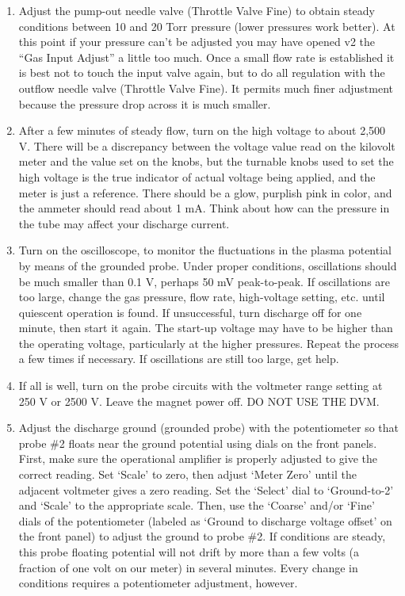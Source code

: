 \documentclass{../lab}
\begin{document}
\begin{enumerate}
    \item Adjust the pump-out needle valve (Throttle Valve Fine) to obtain steady conditions between 10 and 20 Torr pressure (lower pressures work better). At this point if your pressure can't be adjusted you may have opened v2 the ``Gas Input Adjust'' a little too much. Once a small flow rate is established it is best not to touch the input valve again, but to do all regulation with the outflow needle valve (Throttle Valve Fine). It permits much finer adjustment because the pressure drop across it is much smaller.

    \item After a few minutes of steady flow, turn on the high voltage to about 2,500 V. There will be a discrepancy between the voltage value read on the kilovolt meter and the value set on the knobs, but the turnable knobs used to set the high voltage is the true indicator of actual voltage being applied, and the meter is just a reference. There should be a glow, purplish pink in color, and the ammeter should read about 1 mA. Think about how can the pressure in the tube may affect your discharge current.

    \item Turn on the oscilloscope, to monitor the fluctuations in the plasma potential by means of the grounded probe. Under proper conditions, oscillations should be much smaller than 0.1 V, perhaps 50 mV peak-to-peak. If oscillations are too large, change the gas pressure, flow rate, high-voltage setting, etc. until quiescent operation is found. If unsuccessful, turn discharge off for one minute, then start it again. The start-up voltage may have to be higher than the operating voltage, particularly at the higher pressures. Repeat the process a few times if necessary. If oscillations are still too large, get help.

    \item If all is well, turn on the probe circuits with the voltmeter range setting at 250 V or 2500 V. Leave the magnet power off. DO NOT USE THE DVM.

    \item Adjust the discharge ground (grounded probe) with the potentiometer so that probe \#2 floats near the ground potential using dials on the front panels. First, make sure the operational amplifier is properly adjusted to give the correct reading. Set `Scale' to zero, then adjust `Meter Zero' until the adjacent voltmeter gives a zero reading. Set the `Select' dial to `Ground-to-2' and `Scale' to the appropriate scale. Then, use the `Coarse' and/or `Fine' dials of the potentiometer (labeled as `Ground to discharge voltage offset' on the front panel) to adjust the ground to probe \#2. If conditions are steady, this probe floating potential will not drift by more than a few volts (a fraction of one volt on our meter) in several minutes. Every change in conditions requires a potentiometer adjustment, however.

\end{enumerate}
\end{document}
